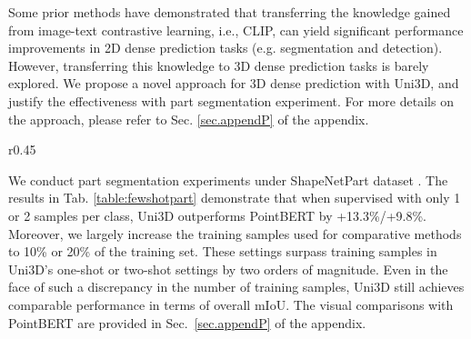 \documentclass{article} \usepackage{iclr2024_conference,times}
\def\Ours{Uni3D\xspace}
\begin{document}
Some prior methods \citep{rao2022denseclip,yang2022lavt} have demonstrated that transferring the knowledge gained from image-text contrastive learning, i.e., CLIP, can yield significant performance improvements in 2D dense prediction tasks (e.g. segmentation and detection). However, transferring this knowledge to 3D dense prediction tasks is barely explored. We propose a novel approach for 3D dense prediction with \Ours, and justify the effectiveness with part segmentation experiment. For more details on the approach, please refer to Sec. \ref{sec.appendP} of the appendix.



\begin{wraptable}{r}{0.45\columnwidth}\small
\vspace{-0.7cm}
\centering
   \caption{Few-shot part segmentation results on the ShapeNetPart dataset.}
   \label{table:fewshotpart}
   \vspace{-1.3cm}
\end{wraptable}


      



    



We conduct part segmentation experiments under ShapeNetPart dataset \citep{yi2016scalable}. The results in Tab. \ref{table:fewshotpart} demonstrate that when supervised with only 1 or 2 samples per class, \Ours outperforms PointBERT by +13.3\%/+9.8\%. Moreover, we largely increase the training samples used for comparative methods to 10\% or 20\% of the training set. These settings surpass training samples in \Ours's one-shot or two-shot settings by two orders of magnitude. Even in the face of such a discrepancy in the number of training samples, \Ours still achieves comparable performance in terms of overall mIoU. 
The visual comparisons with PointBERT are provided in Sec.~\ref{sec.appendP} of the appendix.
\end{document}
